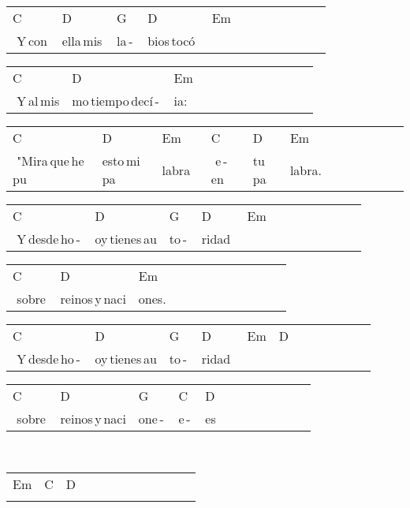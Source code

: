 \begin{multicols}{2}
\begin{minipage}{\columnwidth}
\noindent
\begin{tabular}{llllllllllll}
C&D&G&D&Em\\
\,\,Y\,con\,&ella\,mis\,&la\,-\,&bios\,tocó\,\,&
\end{tabular}

\noindent
\begin{tabular}{llllllllllll}
C&D&Em\\
\,\,Y\,al\,mis&mo\,tiempo\,decí\,-\,&ia:
\end{tabular}

\noindent
\begin{tabular}{llllllllllll}
C&D&Em&C&D&Em\\
\,\,"Mira\,que\,he\,pu&esto\,mi\,pa&labra\,\,\,\,&\,\,e\,-\,en\,&tu\,pa&labra.
\end{tabular}

\noindent
\begin{tabular}{llllllllllll}
C&D&G&D&Em\\
\,\,Y\,desde\,ho\,-\,&oy\,tienes\,au&to\,-\,&ridad\,\,&
\end{tabular}

\noindent
\begin{tabular}{llllllllllll}
C&D&Em\\
\,\,sobre\,&reinos\,y\,naci&ones.
\end{tabular}

\noindent
\begin{tabular}{llllllllllll}
C&D&G&D&Em&D\\
\,\,Y\,desde\,ho\,-\,&oy\,tienes\,au&to\,-\,&ridad\,\,&\,&
\end{tabular}

\noindent
\begin{tabular}{llllllllllll}
C&D&G&C&D\\
\,\,sobre\,&reinos\,y\,naci&one\,-\,&e\,-\,&es
\end{tabular}
\end{minipage}\\


\chorus{}

\noindent
\begin{minipage}{\columnwidth}
\noindent
\noindent
\begin{tabular}{llllllllllll}
Em&C&D\\
\quad\quad\quad\quad&\quad\quad\quad&
\end{tabular}
\end{minipage}\\


\chorus{}


\end{multicols}
